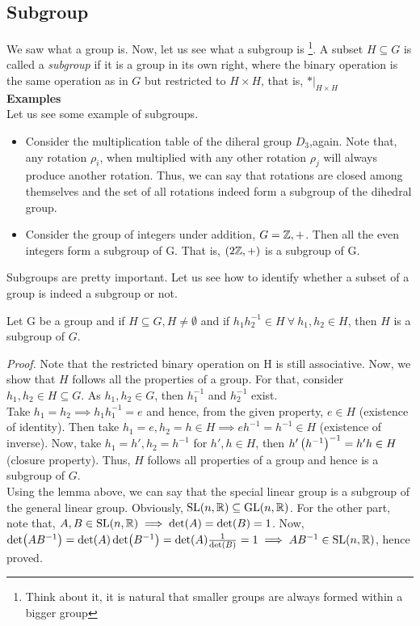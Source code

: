 \subsection{Subgroup}
We saw what a group is. Now, let us see what a subgroup is \footnote{Think about it, it is natural that smaller groups are always formed within a bigger group}. A subset $H\subseteq G$ is called a \textit{subgroup} if it is a group in its own right, where the binary operation is the same operation as in $G$ but restricted to $H\times H$, that is, $*\Big|_{H\times H}$\\[0.2cm]
\textbf{Examples}\\[0.2cm]
Let us see some example of subgroups. 
\begin{itemize}
    \item Consider the multiplication table of the diheral group $D_3$,again. Note that, any rotation $\rho_i$, when multiplied with any other rotation $\rho_j$ will always produce another rotation. Thus, we can say that rotations are closed among themselves and the set of all rotations indeed form a subgroup of the dihedral group. 
    \item Consider the group of integers under addition, $G={\mathbb{Z}, + }$. Then all the even integers form a subgroup of G. That is, $(2\mathbb{Z},+)$ is a subgroup of G.  
\end{itemize}
Subgroups are pretty important. Let us see how to identify whether a subset of a group is indeed a subgroup or not.
\begin{lemma}\label{lem:subgroup}
    Let G be a group and if $H\subseteq G, H \neq \emptyset$ and if $h_1h_2^{-1}\in H\ \forall \ h_1,h_2\in H$, then $H$ is a subgroup of $G$.
\end{lemma}
\textit{Proof.} Note that the restricted binary operation on H is still associative. Now, we show that $H$ follows all the properties of a group. For that, consider $h_1,h_2\in H\subseteq G$. As $h_1,h_2\in G$, then $h_1^{-1}$ and $h_2^{-1}$ exist.\\[0.2cm]
Take $h_1 = h_2\implies h_1 h_1^{-1} = e$ and hence, from the given property, $e\in H$ (existence of identity). Then take $h_1 =e, h_2 = h \in H \implies eh^{-1} = h^{-1}\in H$ (existence of inverse). Now, take $h_1 = h', h_2 = h^{-1}$ for $h', h\in H$, then $h'\left( h^{-1} \right)^{-1}=h'h\in H$ (closure property). Thus, $H$ follows all properties of a group and hence is a subgroup of $G$.\\[0.3cm]
Using the lemma above, we can say that the special linear group is a subgroup of the general linear group. Obviously, $\mathrm{SL}(n,\mathbb{R})\subseteq \mathrm{GL}(n,\mathbb{R})$.  For the other part, note that,  $A,B\in \mathrm{SL}(n,\mathbb{R})\implies \det(A) = \det(B)=1$. Now, $\det(AB^{-1}) = \det(A)\det(B^{-1}) = \det(A)\frac{1}{\det(B)} = 1 \implies AB^{-1}\in \mathrm{SL}(n,\mathbb{R})$, hence proved.
